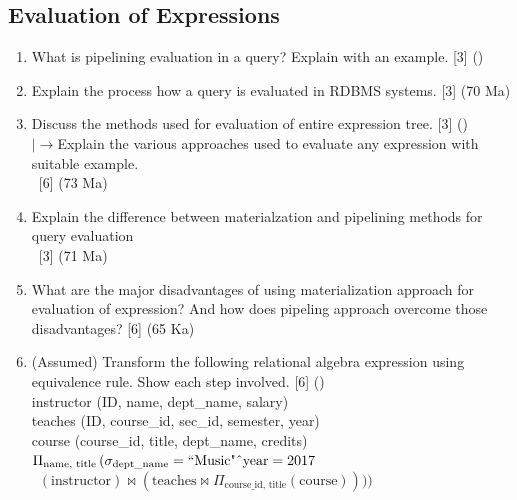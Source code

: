 \documentclass[12pt]{article}
\newcommand{\lb}{\\$\left|\rightarrow\right.$}
\newcommand{\enter}{\\\textcolor{white}{1}}
\begin{document}
    \subsection{Evaluation of Expressions}
        \begin{enumerate}[noitemsep, topsep=0pt]            
            \item What is pipelining evaluation in a query? Explain with an example. \hfill [3] ()
            
            \item Explain the process how a query is evaluated in RDBMS systems. \hfill [3] (70 Ma)
            
			\item Discuss the methods used for evaluation of entire expression tree. \hfill [3] ()   
			\lb Explain the various approaches used to evaluate any expression with suitable example. 
			\enter\hfill [6] (73 Ma) 			
			
			\item Explain the difference between materialzation and pipelining methods for query evaluation 
			\enter\hfill [3] (71 Ma)
    			
			\item What are the major disadvantages of using materialization approach for evaluation of expression? And how does pipeling approach overcome those disadvantages? \hfill [6] (65 Ka)    			
    			
    			\item (Assumed) Transform the following relational algebra expression using equivalence rule. Show each step involved. \hfill [6] ()\\
    			instructor (ID, name, dept\_name, salary)\\
    			teaches (ID, course\_id, sec\_id, semester, year)\\
    			course (course\_id, title, dept\_name, credits)\\
    			$\Pi_{\text{name, title}} \left( 
    \sigma_{\text{dept\_name}} = \text{``Music"} \char`\^ \text{year} = 2017 \right.$
			\enter\hspace{2cm}$ (\text{instructor}) \bowtie \left( \text{teaches} \bowtie \Pi_{\text{course\_id, title}} (\text{course}) \right)
)) $
    		\end{enumerate}
    		
\end{document}
